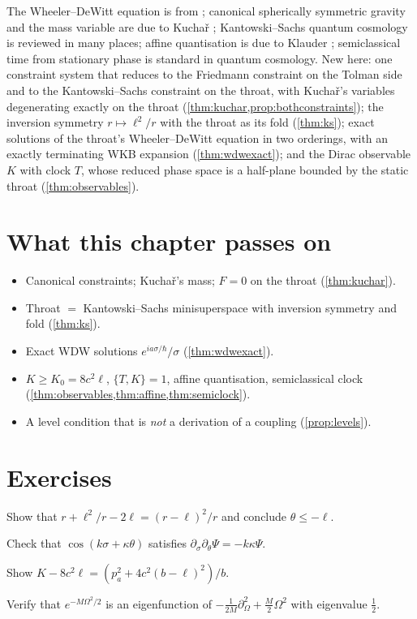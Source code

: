 \begin{litbox}
The Wheeler--DeWitt equation is from \cite{DeWitt1967}; canonical spherically symmetric gravity and the mass variable are due to Kucha\v{r} \cite{Kuchar1994}; Kantowski--Sachs quantum cosmology is reviewed in many places; affine quantisation is due to Klauder \cite{Klauder2012}; semiclassical time from stationary phase is standard in quantum cosmology. New here: one constraint system that reduces to the Friedmann constraint on the Tolman side and to the Kantowski--Sachs constraint on the throat, with Kucha\v{r}'s variables degenerating exactly on the throat (\cref{thm:kuchar,prop:bothconstraints}); the inversion symmetry $r\mapsto\ell^2/r$ with the throat as its fold (\cref{thm:ks}); exact solutions of the throat's Wheeler--DeWitt equation in two orderings, with an exactly terminating WKB expansion (\cref{thm:wdwexact}); and the Dirac observable $K$ with clock $T$, whose reduced phase space is a half-plane bounded by the static throat (\cref{thm:observables}).
\end{litbox}

\section*{What this chapter passes on}
\begin{itemize}[nosep]
\item Canonical constraints; Kucha\v{r}'s mass; $F=0$ on the throat (\cref{thm:kuchar}).
\item Throat $=$ Kantowski--Sachs minisuperspace with inversion symmetry and fold (\cref{thm:ks}).
\item Exact WDW solutions $e^{ia\sigma/\hbar}/\sigma$ (\cref{thm:wdwexact}).
\item $K\ge K_0=8c^2\ell$, $\{T,K\}=1$, affine quantisation, semiclassical clock (\cref{thm:observables,thm:affine,thm:semiclock}).
\item A level condition that is \emph{not} a derivation of a coupling (\cref{prop:levels}).
\end{itemize}

\section*{Exercises}
\begin{exercise}
Show that $r+\ell^2/r-2\ell=(r-\ell)^2/r$ and conclude $\theta\le-\ell$.
\end{exercise}
\begin{exercise}
Check that $\cos(k\sigma+\kappa\theta)$ satisfies $\partial_\sigma\partial_\theta\Psi=-k\kappa\Psi$.
\end{exercise}
\begin{exercise}
Show $K-8c^2\ell=(p_a^2+4c^2(b-\ell)^2)/b$.
\end{exercise}
\begin{exercise}
Verify that $e^{-M\Omega^2/2}$ is an eigenfunction of $-\frac1{2M}\partial_\Omega^2+\frac M2\Omega^2$ with eigenvalue $\frac12$.
\end{exercise}

